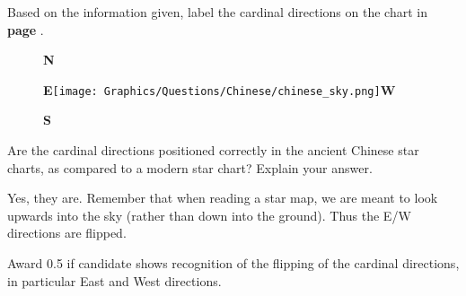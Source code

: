 \documentclass[a4paper,11pt,draft]{exam}
\begin{document}
\begin{questions}
\filbreak
\question[1]
	Based on the information given, label the cardinal directions on the chart in \textbf{page \pageref{chinese_sky}}.
	\droppoints
	\begin{solution}
		\begin{figure}[H]
			\centering 
			\textbf{N}
			
			\centering
			\textbf{E}\texttt{[image: Graphics/Questions/Chinese/chinese\_sky.png]}\textbf{W}
			
			\centering
			\textbf{S}
		\end{figure}
	\end{solution}

\question[1]
	Are the cardinal directions positioned correctly in the ancient Chinese star charts, as compared to a modern star chart? Explain your answer.
	\droppoints
	\begin{solution}
		Yes, they are. Remember that when reading a star map, we are meant to look upwards into the sky (rather than down into the ground). Thus the E/W directions are flipped.
		
		Award 0.5 if candidate shows recognition of the flipping of the cardinal directions, in particular East and West directions.
	\end{solution}

\end{questions}
\end{document}
